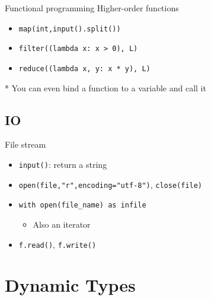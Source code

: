 \documentclass{../TexTemplate/myslide}
\begin{document}
\begin{frame}[fragile]{Functional programming}
Higher-order functions
\begin{itemize}
	\item \verb'map(int,input().split())'
	\item \verb'filter((lambda x: x > 0), L)'
	\item \verb'reduce((lambda x, y: x * y), L)'
\end{itemize}
* You can even bind a function to a variable and call it
\end{frame}

\subsection{IO}
\begin{frame}[fragile]{File stream}
\begin{itemize}
	\item \verb'input()': return a string
	\item \verb;open(file,"r",encoding="utf-8");, \verb'close(file)'
	\item \verb'with open(file_name) as infile'
	\begin{itemize}
		\item Also an iterator
	\end{itemize}
	\item \verb'f.read()', \verb'f.write()'
\end{itemize}
\end{frame}

\section{Dynamic Types}
\begin{frame}
\sectionpage
\end{frame}
\end{document}
